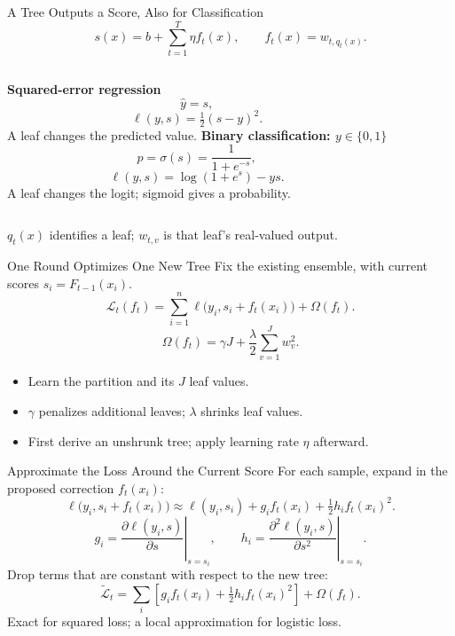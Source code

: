 \begin{frame}{A Tree Outputs a Score, Also for Classification}
  \[s(x)=b+\sum_{t=1}^{T}\eta f_t(x),\qquad f_t(x)=w_{t,q_t(x)}.\]
  \vspace{.2cm}
  \begin{columns}[T,onlytextwidth]
    \textbf{Squared-error regression}
    \[\widehat y=s,\]
    \[\ell(y,s)=\tfrac12(s-y)^2.\]
    A leaf changes the predicted value.
    \pause
    \textbf{Binary classification: $y\in\{0,1\}$}
    \[p=\sigma(s)=\frac{1}{1+e^{-s}},\]
    \[\ell(y,s)=\log(1+e^s)-ys.\]
    A leaf changes the logit; sigmoid gives a probability.
  \end{columns}
  \vspace{.25cm}
  \centering $q_t(x)$ identifies a leaf; $w_{t,v}$ is that leaf's real-valued output.
\end{frame}

\begin{frame}{One Round Optimizes One New Tree}
  Fix the existing ensemble, with current scores $s_i=F_{t-1}(x_i)$.
  \vspace{.25cm}
  \[
    \mathcal L_t(f_t)=\sum_{i=1}^{n}\ell\bigl(y_i,s_i+f_t(x_i)\bigr)
      +\Omega(f_t).
  \]
  \[
    \Omega(f_t)=\gamma J+\frac\lambda2\sum_{v=1}^{J}w_v^2.
  \]
  \pause
  \begin{itemize}\spaceditems
    \item Learn the partition and its $J$ leaf values.
    \item $\gamma$ penalizes additional leaves; $\lambda$ shrinks leaf values.
    \item First derive an unshrunk tree; apply learning rate $\eta$ afterward.
  \end{itemize}
\end{frame}

\begin{frame}{Approximate the Loss Around the Current Score}
  For each sample, expand in the proposed correction $f_t(x_i)$:
  \[
    \ell\bigl(y_i,s_i+f_t(x_i)\bigr)
    \approx \ell(y_i,s_i)+g_if_t(x_i)+\tfrac12h_if_t(x_i)^2.
  \]
  \pause
  \[g_i=\left.\frac{\partial\ell(y_i,s)}{\partial s}\right|_{s=s_i},
    \qquad h_i=\left.\frac{\partial^2\ell(y_i,s)}{\partial s^2}\right|_{s=s_i}.\]
  \pause
  \vspace{.2cm}
  Drop terms that are constant with respect to the new tree:
  \[
    \widetilde{\mathcal L}_t
     =\sum_i\left[g_if_t(x_i)+\tfrac12h_if_t(x_i)^2\right]+\Omega(f_t).
  \]
  \centering Exact for squared loss; a local approximation for logistic loss.
\end{frame}

